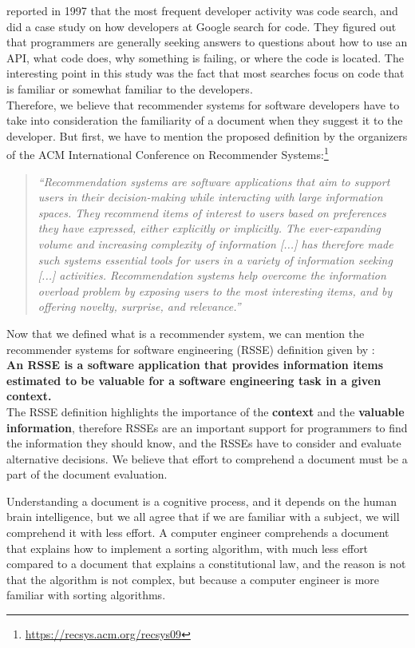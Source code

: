 \documentclass[mscthesis,20pt]{usiinfthesis}
\begin{document}
\newpage
	\citep{Singer-1997} reported in 1997 that the most frequent developer activity was code search, and \citep{Sadowski:2015} did a case study on how developers at Google search for code. They figured out that programmers are generally seeking answers to questions about how to use an API, what code does, why something is failing, or where the code is located. The interesting point in this study was the fact that most searches focus on code that is familiar or somewhat familiar to the developers.\\
	Therefore, we believe that recommender systems for software developers have to take into consideration the familiarity of a document when they suggest it to the developer. But first, we have to mention the proposed definition by the organizers of the ACM International Conference on Recommender Systems:\footnote{\url{https://recsys.acm.org/recsys09}} \\

	  \blockquote{\textit{``Recommendation systems are software applications that aim to support users in their decision-making while interacting with large information spaces. They recommend items of interest to users based on preferences they have expressed, either explicitly or implicitly. The ever-expanding volume and increasing complexity of information [...] has therefore made such systems essential tools for users in a variety of information seeking [...] activities. Recommendation systems help overcome the information overload problem by exposing users to the most interesting items, and by offering novelty, surprise, and relevance.''}}
	Now that we defined what is a recommender system, we can mention the recommender systems for software engineering (RSSE) definition given by \citet{RecommendationSystemsforSoftwareEngineering}:\\

	\textbf{An RSSE is a software application that provides information items estimated to be valuable for a software engineering task in a given context.}\\

	The RSSE definition highlights the importance of the \textbf{context} and the \textbf{valuable information}, therefore RSSEs are an important support for programmers to find the information they should know, and the RSSEs have to consider and evaluate alternative decisions. We believe that effort to comprehend a document must be a part of the document evaluation.\newpage


	Understanding a document is a cognitive process, and it depends on the human brain intelligence, but we all agree that if we are familiar with a subject, we will comprehend it with less effort. A computer engineer comprehends a document that explains how to implement a sorting algorithm, with much less effort compared to a document that explains a constitutional law, and the reason is not that the algorithm is not complex, but because a computer engineer is more familiar with sorting algorithms.\\
	
\end{document}
